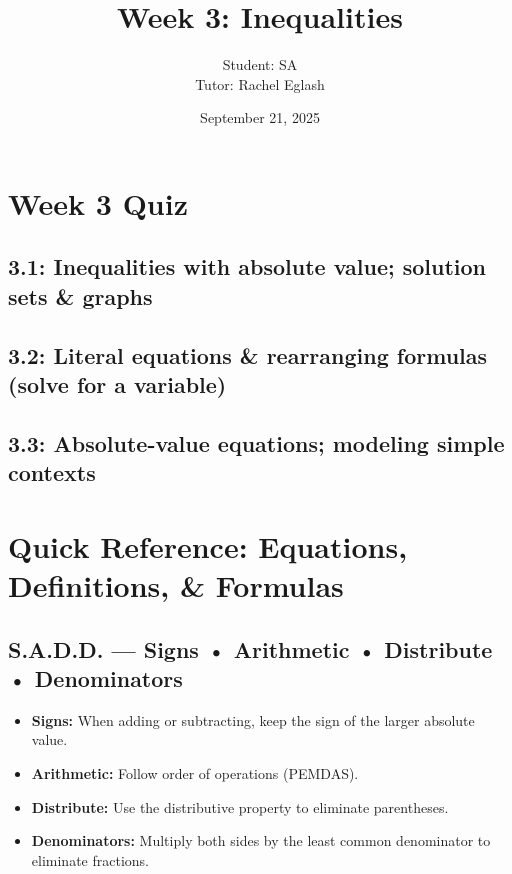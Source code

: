 \documentclass[12pt]{article}
\title{Week 3: Inequalities}
\author{
	Student: SA\\
	Tutor: Rachel Eglash}
\date{September 21, 2025}
\begin{document}
	
	\maketitle

	\section*{Week 3 Quiz}
        
        \subsection*{3.1: Inequalities with absolute value; solution sets \& graphs}

	    \subsection*{3.2: Literal equations \& rearranging formulas (solve for a variable)}
        
        \subsection*{3.3: Absolute-value equations; modeling simple contexts}
	    
            \newpage

    \section*{Quick Reference: Equations, Definitions, \& Formulas}
            
        \subsection*{S.A.D.D. — Signs • Arithmetic • Distribute • Denominators}
            \begin{itemize}
                \item \textbf{Signs:} When adding or subtracting, keep the sign of the larger absolute value.
                \item \textbf{Arithmetic:} Follow order of operations (PEMDAS).
                \item \textbf{Distribute:} Use the distributive property to eliminate parentheses.
                \item \textbf{Denominators:} Multiply both sides by the least common denominator to eliminate fractions.
            \end{itemize}
        
\end{document}
